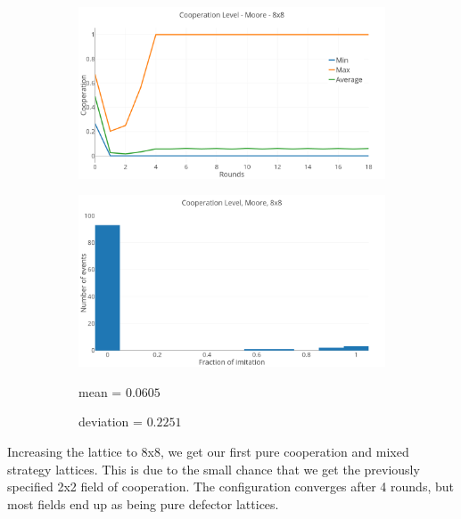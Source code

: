 \documentclass[a4paper, 11pt]{article}
\begin{document}
\begin{figure}[H]
\begin{subfigure}{.75\textwidth}
	\includegraphics[width=1\linewidth]{PDMoore8x8}
\end{subfigure}

\begin{subfigure}{.75\textwidth}
	\includegraphics[width=1\linewidth]{PDMoore8x8HG}
\end{subfigure}%
\begin{subfigure}{.25\textwidth}
	mean = $0.0605$
	
	deviation = $0.2251$
\end{subfigure}

\end{figure}

Increasing the lattice to 8x8, we get our first pure cooperation and mixed strategy lattices. This is due to the small chance that we get the previously specified 2x2 field of cooperation. The configuration converges after 4 rounds, but most fields end up as being pure defector lattices.

\newpage
\end{document}
